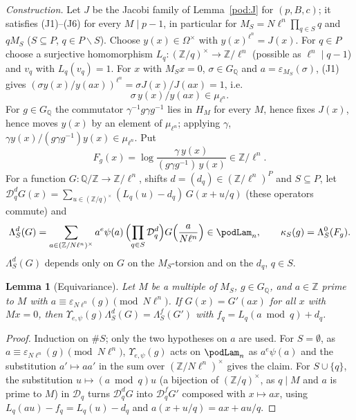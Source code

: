 \documentclass[10pt]{amsart}
\newtheorem{lemma}[theorem]{Lemma}
\theoremstyle{definition}
\theoremstyle{remark}
\newcommand{\Z}{\mathbb Z}
\newcommand{\Q}{\mathbb Q}
\begin{document}
\emph{Construction.} Let $J$ be the Jacobi family of Lemma~\ref{pod:J} for $(p,B,c)$; it satisfies
(J1)--(J6) for every $M\mid p-1$, in particular for $M_S=N\ell^n\prod_{q\in S}q$ and $qM_S$ ($S
\subseteq P$, $q\in P\smallsetminus S$). Choose $y(x)\in\Omega^\times$ with $y(x)^{\ell^n}=J(x)$. For
$q\in P$ choose a surjective homomorphism $L_q\colon(\Z/q)^\times\to\Z/\ell^n$ (possible as
$\ell^n\mid q-1$) and $v_q$ with $L_q(v_q)=1$. For $x$ with $M_Sx=0$, $\sigma\in G_\Q$ and
$a=\varepsilon_{M_S}(\sigma)$, (J1) gives $(\sigma y(x)/y(ax))^{\ell^n}=\sigma J(x)/J(ax)=1$, i.e.
\begin{equation}\label{pod:eq-root}
\sigma\,y(x)/y(ax)\in\mu_{\ell^n}.
\end{equation}
For $g\in G_\Q$ the commutator $\gamma^{-1}g\gamma g^{-1}$ lies in $H_{M}$ for every $M$, hence fixes
$J(x)$, hence moves $y(x)$ by an element of $\mu_{\ell^n}$; applying $\gamma$, $\gamma y(x)/(g\gamma
g^{-1})y(x)\in\mu_{\ell^n}$. Put
\[
F_g(x)=\log\frac{\gamma\,y(x)}{(g\gamma g^{-1})\,y(x)}\in\Z/\ell^n .
\]
For a function $G\colon\Q/\Z\to\Z/\ell^n$, shifts $d=(d_q)\in(\Z/\ell^n)^P$ and $S\subseteq P$, let
$\mathcal D_q^{d}G(x)=\sum_{u\in(\Z/q)^\times}(L_q(u)-d_q)\,G(x+u/q)$ (these operators commute) and
\[
\Lambda_S^d(G)=\sum_{a\in(\Z/N\ell^n)^\times}a^e\psi(a)\,\Bigl(\prod_{q\in S}\mathcal D_q^d\Bigr)G
\Bigl(\frac a{N\ell^n}\Bigr)\in\podLam_n,
\qquad \kappa_S(g)=\Lambda_S^0(F_g).
\]
$\Lambda_S^d(G)$ depends only on $G$ on the $M_S$-torsion and on the $d_q$, $q\in S$.

\begin{lemma}[Equivariance]\label{pod:equiv}
Let $M$ be a multiple of $M_S$, $g\in G_\Q$, and $a\in\Z$ prime to $M$ with $a\equiv
\varepsilon_{N\ell^n}(g)\pmod{N\ell^n}$. If $G(x)=G'(ax)$ for all $x$ with $Mx=0$, then $\Upsilon_{e,\psi}(g)\Lambda_S^d(G)=\Lambda_S^{f}(G')$
with $f_q=L_q(a\bmod q)+d_q$.
\end{lemma}
\begin{proof}
Induction on $\#S$; only the two hypotheses on $a$ are used. For $S=\emptyset$, as $a\equiv
\varepsilon_{N\ell^n}(g)\pmod{N\ell^n}$, $\Upsilon_{e,\psi}(g)$ acts on $\podLam_n$ as $a^e\psi(a)$ and the
substitution $a'\mapsto aa'$ in the sum over $(\Z/N\ell^n)^\times$ gives the claim. For $S\cup\{q\}$,
the substitution $u\mapsto(a\bmod q)u$ (a bijection of $(\Z/q)^\times$, as $q\mid M$ and $a$ is prime to $M$) in $\mathcal D_q$ turns $\mathcal D_q^dG$ into $\mathcal
D_q^fG'$ composed with $x\mapsto ax$, using $L_q(au)-f_q=L_q(u)-d_q$ and $a(x+u/q)=ax+au/q$.
\end{proof}
\end{document}
